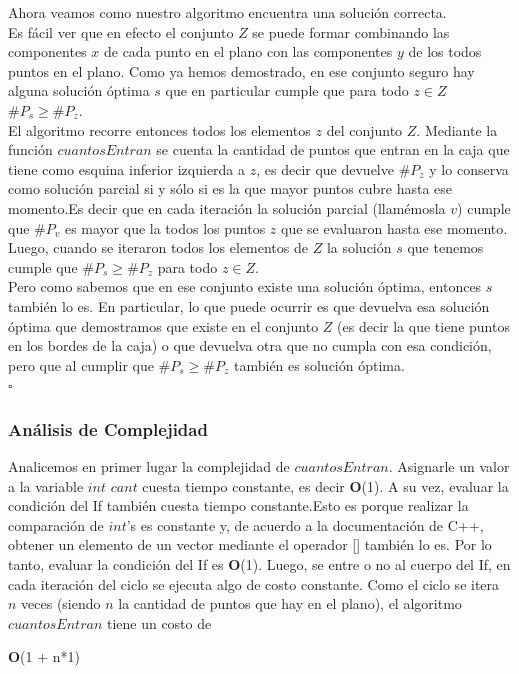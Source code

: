 \indent Ahora veamos como nuestro algoritmo encuentra una soluci\'on correcta.\\
\indent Es f\'acil ver que en efecto el conjunto $Z$ se puede formar combinando las componentes $x$ de cada punto en el plano con las componentes $y$ de los todos puntos en el plano. Como ya hemos demostrado, en ese conjunto seguro hay alguna soluci\'on \'optima $s$ que en particular cumple que para todo $z \in Z$  $\#P_{s} \geq \#P_{z}$. \\
\indent El algoritmo recorre entonces todos los elementos $z$ del conjunto $Z$. Mediante la funci\'on  $cuantosEntran$ se cuenta la cantidad de puntos que entran en la caja que tiene como esquina inferior izquierda a $z$, es decir que devuelve $\#P_{z}$  y lo conserva como soluci\'on parcial si y sólo si es la que mayor puntos cubre hasta ese momento.Es decir que en cada iteraci\'on la soluci\'on parcial (llam\'emosla $v$) cumple que $\#P_{v}$ es mayor que la todos los puntos $z$ que se evaluaron hasta ese momento.\\
\indent Luego, cuando se iteraron todos los elementos de $Z$ la soluci\'on $s$ que tenemos cumple que $\#P_{s} \geq \#P_{z}$ para todo $z \in Z$.\\
\indent Pero como sabemos que en ese conjunto existe una soluci\'on \'optima, entonces $s$ tambi\'en lo es. En particular, lo que puede ocurrir es que devuelva esa soluci\'on \'optima que demostramos que existe en el conjunto $Z$ (es decir la que tiene puntos en los bordes de la caja) o que devuelva otra que no cumpla con esa condici\'on, pero que al cumplir que $\#P_{s} \geq \#P_{z} $ tambi\'en es soluci\'on \'optima.\\

\indent \indent \indent \indent \indent \indent \indent \indent \indent \indent \indent \indent \indent \indent  \indent \indent $\square$




\subsubsection{Análisis de Complejidad}

\indent Analicemos en primer lugar la complejidad de $cuantosEntran$. Asignarle un valor a la variable $int$ $cant$ cuesta tiempo constante, es decir \textbf{O}(1). A su vez, evaluar la condición del If también cuesta tiempo constante.Esto es porque realizar la comparaci\'on de $int$'s es constante y, de acuerdo a la documentaci\'on de C++, obtener un elemento de un vector mediante el operador [] tambi\'en lo es. Por lo tanto, evaluar la condición del If es \textbf{O}(1). Luego, se entre o no al cuerpo del If, en cada iteraci\'on del ciclo se ejecuta algo de costo constante. Como el ciclo se itera $n$ veces (siendo $n$ la cantidad de puntos que hay en el plano), el algoritmo $cuantosEntran$ tiene un costo de\\
\begin{center}
\textbf{O}(1 + n*1)
\end{center}\\

